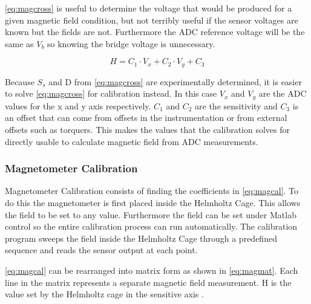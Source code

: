 \autoref{eq:magcross} is useful to determine the voltage that would be produced for a given magnetic field condition, but not terribly useful if the sensor voltages are known but the fields are not. Furthermore the \ac{ADC} reference voltage will be the same as $V_b$ so knowing the bridge voltage is unnecessary. 
 
\begin{equation}
    H = C_1 \cdot V_x + C_2 \cdot V_y + C_3
    \label{eq:magcal}
\end{equation}

Because $S_s$ and D from \autoref{eq:magcross} are experimentally determined, it is easier to solve \autoref{eq:magcross} for calibration instead. In this case $V_x$ and $V_y$ are the \ac{ADC} values for the x and y axis respectively. $C_1$ and $C_2$ are the sensitivity and $C_3$ is an offset that can come from offsets in the instrumentation or from external offsets such as torquers. This makes the values that the calibration solves for directly usable to calculate magnetic field from \ac{ADC} measurements.

\subsubsection{Magnetometer Calibration}

Magnetometer Calibration consists of finding the coefficients in \autoref{eq:magcal}. To do this the magnetometer is first placed inside the Helmholtz Cage. This allows the field to be set to any value. Furthermore the field can be set under Matlab control so the entire calibration process can run automatically. The calibration program sweeps the field inside the Helmholtz Cage through a predefined sequence and reads the sensor output at each point. 

\autoref{eq:magcal} can be rearranged into matrix form as shown in \autoref{eq:magmat}. Each line in the matrix represents a separate magnetic field measurement. H is the value set by the Helmholtz cage in the sensitive axis . 


